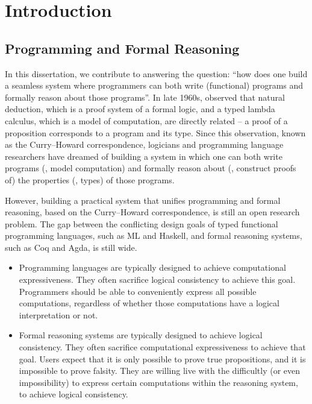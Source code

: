 \chapter{Introduction}\label{ch:intro}

\section{Programming and Formal Reasoning}\label{sec:intro:motiv}
In this dissertation, we contribute to answering the question:
``how does one build a seamless system where programmers can both
write (functional) programs and formally reason about those programs''.
In late 1960s, \citet{Howard69} observed that natural deduction, which is
a proof system of a formal logic, and a typed lambda calculus, which is
a model of computation, are directly related --
a proof of a proposition corresponds to a program and its type.
Since this observation, known as the Curry--Howard correspondence,
logicians and programming language researchers 
have  dreamed of
building a system in which one can both write programs
(\ie, model computation) and formally reason about (\ie, construct proofs of)
the properties (\ie, types) of those programs.

However, building a practical system that unifies programming and
formal reasoning, based on the Curry--Howard correspondence, is still
an open research problem. The gap between the conflicting
design goals of typed functional programming languages, such as ML and Haskell,
and formal reasoning systems, such as Coq and Agda, is still wide.

\begin{itemize}

\item
Programming languages are typically designed to achieve
computational expressiveness. They often sacrifice logical consistency
to achieve this goal. Programmers should be able to
conveniently express all possible computations, regardless of whether those
computations have a logical interpretation or not.

\item
Formal reasoning systems are typically designed to achieve logical consistency.
They often sacrifice computational expressiveness to achieve that goal.
Users expect that it is only possible to prove true propositions,
and it is impossible to prove falsity. They are willing
live with the difficultly (or even impossibility) to
express certain computations within the reasoning system,
to achieve logical consistency.

\end{itemize}


